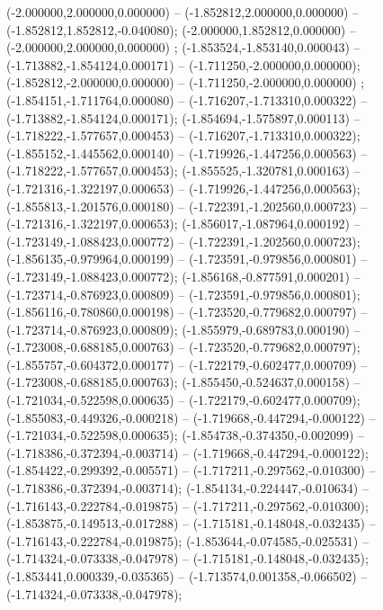  (-2.000000,2.000000,0.000000) -- (-1.852812,2.000000,0.000000) -- (-1.852812,1.852812,-0.040080);
 (-2.000000,1.852812,0.000000) -- (-2.000000,2.000000,0.000000) ;
 (-1.853524,-1.853140,0.000043) -- (-1.713882,-1.854124,0.000171) -- (-1.711250,-2.000000,0.000000);
 (-1.852812,-2.000000,0.000000) -- (-1.711250,-2.000000,0.000000) ;
 (-1.854151,-1.711764,0.000080) -- (-1.716207,-1.713310,0.000322) -- (-1.713882,-1.854124,0.000171);
 (-1.854694,-1.575897,0.000113) -- (-1.718222,-1.577657,0.000453) -- (-1.716207,-1.713310,0.000322);
 (-1.855152,-1.445562,0.000140) -- (-1.719926,-1.447256,0.000563) -- (-1.718222,-1.577657,0.000453);
 (-1.855525,-1.320781,0.000163) -- (-1.721316,-1.322197,0.000653) -- (-1.719926,-1.447256,0.000563);
 (-1.855813,-1.201576,0.000180) -- (-1.722391,-1.202560,0.000723) -- (-1.721316,-1.322197,0.000653);
 (-1.856017,-1.087964,0.000192) -- (-1.723149,-1.088423,0.000772) -- (-1.722391,-1.202560,0.000723);
 (-1.856135,-0.979964,0.000199) -- (-1.723591,-0.979856,0.000801) -- (-1.723149,-1.088423,0.000772);
 (-1.856168,-0.877591,0.000201) -- (-1.723714,-0.876923,0.000809) -- (-1.723591,-0.979856,0.000801);
 (-1.856116,-0.780860,0.000198) -- (-1.723520,-0.779682,0.000797) -- (-1.723714,-0.876923,0.000809);
 (-1.855979,-0.689783,0.000190) -- (-1.723008,-0.688185,0.000763) -- (-1.723520,-0.779682,0.000797);
 (-1.855757,-0.604372,0.000177) -- (-1.722179,-0.602477,0.000709) -- (-1.723008,-0.688185,0.000763);
 (-1.855450,-0.524637,0.000158) -- (-1.721034,-0.522598,0.000635) -- (-1.722179,-0.602477,0.000709);
 (-1.855083,-0.449326,-0.000218) -- (-1.719668,-0.447294,-0.000122) -- (-1.721034,-0.522598,0.000635);
 (-1.854738,-0.374350,-0.002099) -- (-1.718386,-0.372394,-0.003714) -- (-1.719668,-0.447294,-0.000122);
 (-1.854422,-0.299392,-0.005571) -- (-1.717211,-0.297562,-0.010300) -- (-1.718386,-0.372394,-0.003714);
 (-1.854134,-0.224447,-0.010634) -- (-1.716143,-0.222784,-0.019875) -- (-1.717211,-0.297562,-0.010300);
 (-1.853875,-0.149513,-0.017288) -- (-1.715181,-0.148048,-0.032435) -- (-1.716143,-0.222784,-0.019875);
 (-1.853644,-0.074585,-0.025531) -- (-1.714324,-0.073338,-0.047978) -- (-1.715181,-0.148048,-0.032435);
 (-1.853441,0.000339,-0.035365) -- (-1.713574,0.001358,-0.066502) -- (-1.714324,-0.073338,-0.047978);
